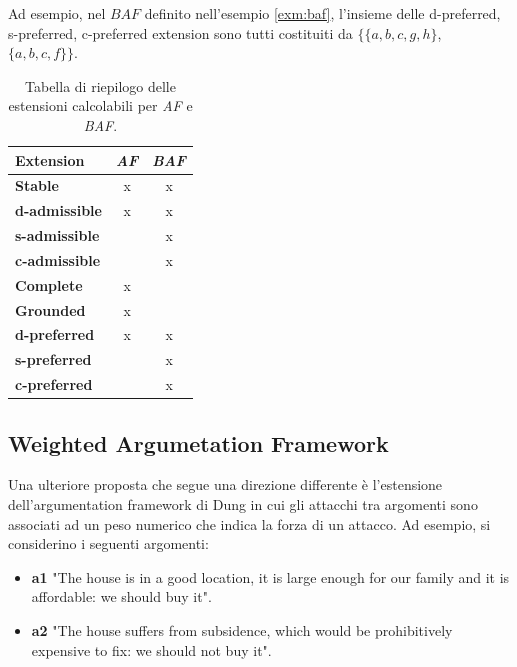 Ad esempio, nel $BAF$ definito nell'esempio \ref{exm:baf}, l'insieme delle d-preferred, s-preferred, c-preferred extension sono tutti costituiti da $\{\{a,b,c,g,h\}$, \\ $\{a,b,c,f\}\}$.



\begin{table}[H]
    \centering
    \begin{tabular}{|l|c|c|}
        \hline
        \textbf{Extension} & \textbf{\textit{AF}} & \textit{\textbf{BAF}} \\ \hline
        \textbf{Stable}       & x & x \\ \hline
        \textbf{d-admissible} & x & x \\ \hline
        \textbf{s-admissible} &   & x \\ \hline
        \textbf{c-admissible} &   & x \\ \hline
        \textbf{Complete}     & x &   \\ \hline
        \textbf{Grounded}     & x &   \\ \hline
        \textbf{d-preferred}  & x & x \\ \hline
        \textbf{s-preferred}  &   & x \\ \hline
        \textbf{c-preferred}  &   & x \\ \hline
    \end{tabular}
    \caption{Tabella di riepilogo delle estensioni calcolabili per \textit{AF} e \textit{BAF}.}
\end{table}


\subsection{Weighted Argumetation Framework}
Una ulteriore proposta che segue una direzione differente è l'estensione dell'argumentation framework di Dung in cui gli attacchi tra argomenti sono associati ad un peso numerico che indica la forza di un attacco. Ad esempio, si considerino i seguenti argomenti:

\begin{itemize}
    \item \textbf{a1} "The house is in a good location, it is large enough for our family and it is affordable: we should buy it".
    \item \textbf{a2} "The house suffers from subsidence, which would be prohibitively expensive to fix: we should not buy it".
\end{itemize}

